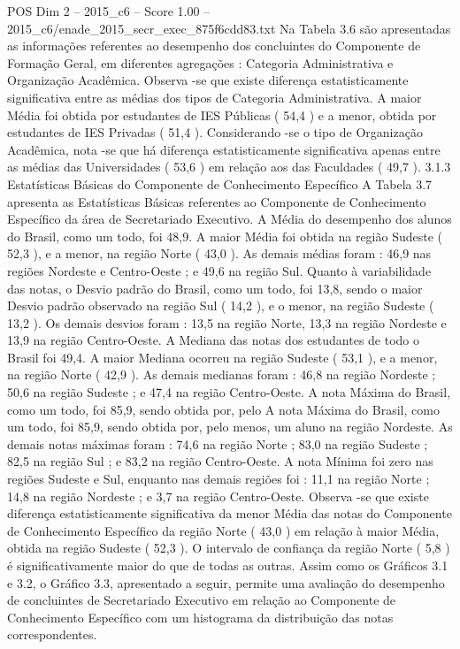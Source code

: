 \begin{textsample}{POS Dim 2 – 2015\_c6 – Score 1.00 – 2015\_c6/enade\_2015\_secr\_exec\_875f6cdd83.txt}
Na Tabela 3.6 são apresentadas as informações referentes ao desempenho dos concluintes do Componente de Formação Geral, em diferentes agregações : Categoria Administrativa e Organização Acadêmica.
Observa -se que existe diferença estatisticamente significativa entre as médias dos tipos de Categoria Administrativa.
A maior Média foi obtida por estudantes de IES Públicas ( 54,4 ) e a menor, obtida por estudantes de IES Privadas ( 51,4 ).
Considerando -se o tipo de Organização Acadêmica, nota -se que há diferença estatisticamente significativa apenas entre as médias das Universidades ( 53,6 ) em relação aos das Faculdades ( 49,7 ). 3.1.3 Estatísticas Básicas do Componente de Conhecimento Específico A Tabela 3.7 apresenta as Estatísticas Básicas referentes ao Componente de Conhecimento Específico da área de Secretariado Executivo.
A Média do desempenho dos alunos do Brasil, como um todo, foi 48,9.
A maior Média foi obtida na região Sudeste ( 52,3 ), e a menor, na região Norte ( 43,0 ).
As demais médias foram : 46,9 nas regiões Nordeste e Centro-Oeste ; e 49,6 na região Sul.
Quanto à variabilidade das notas, o Desvio padrão do Brasil, como um todo, foi 13,8, sendo o maior Desvio padrão observado na região Sul ( 14,2 ), e o menor, na região Sudeste ( 13,2 ).
Os demais desvios foram : 13,5 na região Norte, 13,3 na região Nordeste e 13,9 na região Centro-Oeste.
A Mediana das notas dos estudantes de todo o Brasil foi 49,4.
A maior Mediana ocorreu na região Sudeste ( 53,1 ), e a menor, na região Norte ( 42,9 ).
As demais medianas foram : 46,8 na região Nordeste ; 50,6 na região Sudeste ; e 47,4 na região Centro-Oeste.
A nota Máxima do Brasil, como um todo, foi 85,9, sendo obtida por, pelo A nota Máxima do Brasil, como um todo, foi 85,9, sendo obtida por, pelo menos, um aluno na região Nordeste.
As demais notas máximas foram : 74,6 na região Norte ; 83,0 na região Sudeste ; 82,5 na região Sul ; e 83,2 na região Centro-Oeste.
A nota Mínima foi zero nas regiões Sudeste e Sul, enquanto nas demais regiões foi : 11,1 na região Norte ; 14,8 na região Nordeste ; e 3,7 na região Centro-Oeste.
Observa -se que existe diferença estatisticamente significativa da menor Média das notas do Componente de Conhecimento Específico da região Norte ( 43,0 ) em relação à maior Média, obtida na região Sudeste ( 52,3 ).
O intervalo de confiança da região Norte ( 5,8 ) é significativamente maior do que de todas as outras.
Assim como os Gráficos 3.1 e 3.2, o Gráfico 3.3, apresentado a seguir, permite uma avaliação do desempenho de concluintes de Secretariado Executivo em relação ao Componente de Conhecimento Específico com um histograma da distribuição das notas correspondentes.

\end{textsample}
